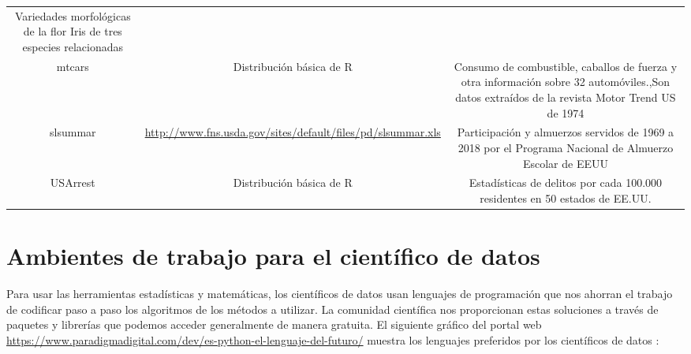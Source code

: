 \documentclass[12pt,]{krantz}
\begin{document}
\begin{longtable}[]{@{}ccc@{}}
\begin{minipage}[t]{0.52\columnwidth}
Variedades morfológicas de la flor Iris de tres especies relacionadas\strut
\end{minipage}\tabularnewline
\begin{minipage}[t]{0.07\columnwidth}\centering
mtcars\strut
\end{minipage} & \begin{minipage}[t]{0.32\columnwidth}\centering
Distribución básica de R\strut
\end{minipage} & \begin{minipage}[t]{0.52\columnwidth}\centering
Consumo de combustible, caballos de fuerza y otra información sobre 32 automóviles.,Son datos extraídos de la revista Motor Trend US de 1974\strut
\end{minipage}\tabularnewline
\begin{minipage}[t]{0.07\columnwidth}\centering
slsummar\strut
\end{minipage} & \begin{minipage}[t]{0.32\columnwidth}\centering
\url{http://www.fns.usda.gov/sites/default/files/pd/slsummar.xls}\strut
\end{minipage} & \begin{minipage}[t]{0.52\columnwidth}\centering
Participación y almuerzos servidos de 1969 a 2018 por el Programa Nacional de Almuerzo Escolar de EEUU\strut
\end{minipage}\tabularnewline
\begin{minipage}[t]{0.07\columnwidth}\centering
USArrest\strut
\end{minipage} & \begin{minipage}[t]{0.32\columnwidth}\centering
Distribución básica de R\strut
\end{minipage} & \begin{minipage}[t]{0.52\columnwidth}\centering
Estadísticas de delitos por cada 100.000 residentes en 50 estados de EE.UU.\strut
\end{minipage}\tabularnewline
\bottomrule
\end{longtable}

\hypertarget{ambientes-de-trabajo-para-el-cientifico-de-datos}{%
\chapter{Ambientes de trabajo para el científico de datos}\label{ambientes-de-trabajo-para-el-cientifico-de-datos}}

Para usar las herramientas estadísticas y matemáticas, los científicos de datos usan lenguajes de programación que nos ahorran el trabajo de codificar paso a paso los algoritmos de los métodos a utilizar. La comunidad científica nos proporcionan estas soluciones a través de paquetes y librerías que podemos acceder generalmente de manera gratuita. El siguiente gráfico del portal web \url{https://www.paradigmadigital.com/dev/es-python-el-lenguaje-del-futuro/} muestra los lenguajes preferidos por los científicos de datos :
\end{document}
